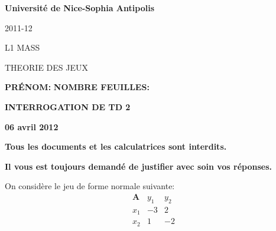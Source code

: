 \documentclass[french,11pt,leqno]{article}
\newcounter{exocount}
\newcounter{questcount}
\def\exo{\bigskip\noindent{\bf Exercice \theexocount {} -}
  \addtocounter{exocount}{1} \setcounter{questcount}{1}}
\begin{document}
\begin{center}
{\bf Universit\'e de Nice-Sophia Antipolis}
\end{center}
\bigskip

\flushright

 2011-12

 L1 MASS 

 THEORIE DES JEUX 

\flushleft

\vskip1cm

 \hspace{5cm} {\bf PR\'ENOM:} \hspace{4cm} {\bf NOMBRE FEUILLES:}


\vskip1cm

\begin{center}
{\bf  INTERROGATION DE TD 2}

{\bf 06 avril 2012 }
\end{center}

\medskip

{\bf \noindent Tous les documents et les calculatrices sont interdits.} 

\smallskip

{\bf \noindent Il vous est toujours demand\'e de justifier avec soin vos r\'eponses.} 

\medskip



\exo
On consid\`ere le jeu de forme normale suivante:
\begin{equation*}
\begin{array}{l|rr}
\mathbf{A}& y_1&y_2 \\ \hline
x_1& -3&2\\
x_2& 1&-2
\end{array}
\end{equation*}
\end{document}
